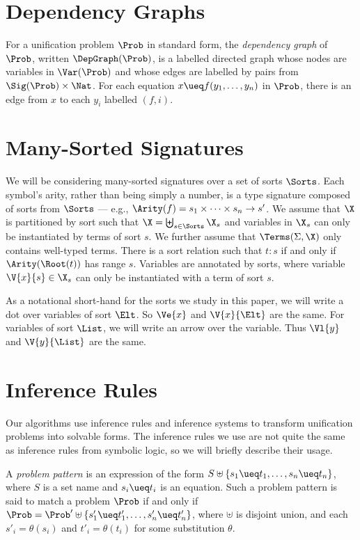 \section{Dependency Graphs}\label{sec:dep-graphs}

For a unification problem $\Prob$ in standard form, the \emph{dependency graph}
of $\Prob$, written $\DepGraph(\Prob)$, is a labelled directed graph whose
nodes are variables in $\Var(\Prob)$ and whose edges are labelled by pairs from
$\Sig(\Prob) \times \Nat$.  For each equation $x \ueq f(y_1, \dotsc, y_n)$ in
$\Prob$, there is an edge from $x$ to each $y_i$ labelled $(f, i)$.

\section{Many-Sorted Signatures}\label{sec:sorts}

We will be considering many-sorted signatures over a set of sorts $\Sorts$.
Each symbol's arity, rather than being simply a number, is a type signature
composed of sorts from $\Sorts$ --- e.g., $\Arity(f) = s_1 \times \dotsb \times
s_n \to s'$. We assume that $\X$ is partitioned by sort such that $\X =
\biguplus_{s \in \Sorts} \X_{s}$ and variables in $\X_{s}$ can only be
instantiated by terms of sort $s$. We further assume that $\Terms(\Sigma, \X)$
only contains well-typed terms. There is a sort relation such that $t : s$ if
and only if $\Arity(\Root(t))$ has range $s$. Variables are annotated by sorts,
where variable $\V{x}{s} \in \X_s$ can only be instantiated with a term of sort
$s$.

As a notational short-hand for the sorts we study in this paper, we will write
a dot over variables of sort $\Elt$. So $\Ve{x}$ and $\V{x}{\Elt}$ are the
same. For variables of sort $\List$, we will write an arrow over the variable.
Thus $\Vl{y}$ and $\V{y}{\List}$ are the same.

\section{Inference Rules}\label{sec:inf-rules}

Our algorithms use inference rules and inference systems to transform
unification problems into solvable forms. The inference rules we use are
not quite the same as inference rules from symbolic logic, so we will briefly
describe their usage.

A \emph{problem pattern} is an expression of the form $S \uplus \{ s_1 \ueq
t_1, \dotsc, s_n \ueq t_n \}$, where $S$ is a set name and $s_i \ueq t_i$ is an
equation. Such a problem pattern is said to match a problem $\Prob$ if and only
if $\Prob = \Prob' \uplus \{ s'_1 \ueq t'_1, \dotsc, s'_n \ueq t'_n \}$, where
$\uplus$ is disjoint union, and each $s'_i = \theta(s_i)$ and $t'_i =
\theta(t_i)$ for some substitution $\theta$.

